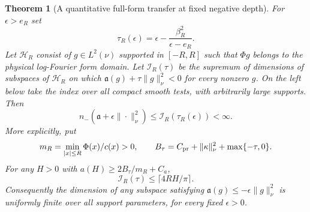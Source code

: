 \documentclass[11pt]{article}
\newtheorem{theorem}{Theorem}
\theoremstyle{remark}\newtheorem{remark}[theorem]{Remark}
\begin{document}
\begin{theorem}[A quantitative full-form transfer at fixed negative depth]
\label{thm:theta-core-index}
For $\epsilon>e_R$ set
\[
 \tau_R(\epsilon)=\epsilon-\frac{\beta_R^2}{\epsilon-e_R}.
\]
Let $\mathcal H_R$ consist of $g\in L^2(\nu)$ supported in
$[-R,R]$ such that $\Phi g$ belongs to the physical log-Fourier
form domain. Let $\mathcal I_R(\tau)$ be the supremum of dimensions
of subspaces of $\mathcal H_R$ on which
$\mathfrak a(g)+\tau\|g\|_\nu^2<0$ for every nonzero $g$.
On the left below take the index over all compact smooth tests,
with arbitrarily large supports. Then
\[
 n_-(\mathfrak a+\epsilon\|\cdot\|_\nu^2)
          \le\mathcal I_R(\tau_R(\epsilon))<\infty.        \tag{TCI}
\]
More explicitly, put
\[
 m_R=\min_{|x|\le R}\Phi(x)/c(x)>0,\qquad
 B_\tau=C_{\rm pr}+\|\kappa\|_\nu^2+\max\{-\tau,0\}.
\]
For any $H>0$ with $a(H)\ge2B_\tau/m_R+C_a$,
\[
                \mathcal I_R(\tau)\le\lceil4RH/\pi\rceil.
                                                               \tag{TCB}
\]
Consequently the dimension of any subspace satisfying
$\mathfrak a(g)\le-\epsilon\|g\|_\nu^2$ is uniformly finite
over all support parameters, for every fixed $\epsilon>0$.
\end{theorem}
\end{document}
